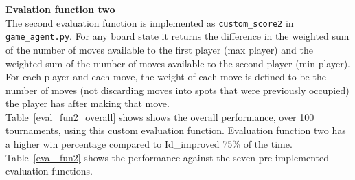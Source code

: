 \documentclass[11pt]{article}
\begin{document}
{\bf Evalation function two}\\
The second evaluation function is implemented as \texttt{custom\_score2} in \texttt{game\_agent.py}. For any board state it returns the difference in the weighted sum of the number of moves available to the first player (max player) and the weighted sum of the number of moves available to the second player (min player). For each player and each move, the weight of each move is defined to be the number of moves (not discarding moves into spots that were previously occupied) the player has after making that move.\\

Table~\ref{eval_fun2_overall} shows shows the overall performance, over 100 tournaments, using this custom evaluation function. Evaluation function two has a higher win percentage compared to Id\_improved 75\% of the time. Table~\ref{eval_fun2} shows the performance against the seven pre-implemented evaluation functions. 
\end{document}
